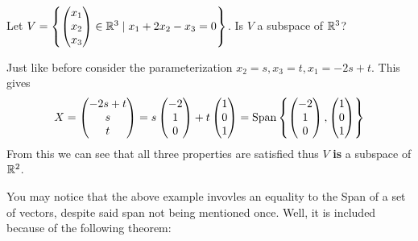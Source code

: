 \begin{example}{}{}
    Let $V = \left\{\begin{pmatrix} x_1 \\ x_2 \\ x_3 \end{pmatrix} \in \mathbb R^{3} \mid x_1 + 2x_2 - x_3 = 0 \right\}$. Is $V$ a subspace of $\mathbb R^{3}$?

    \begin{solution}
        Just like before consider the parameterization $x_2 = s, x_3 = t, x_1 = -2s + t$. This gives 
        \[
            X = \begin{pmatrix}
                -2s + t \\ s \\ t
            \end{pmatrix} 
            = 
            s\begin{pmatrix}
                -2 \\ 1 \\ 0
            \end{pmatrix}
            + 
            t\begin{pmatrix}
                1 \\ 0 \\ 1
            \end{pmatrix}
            = 
            \text{Span}\left\{\begin{pmatrix}
                -2 \\ 1 \\ 0
            \end{pmatrix}, 
            \begin{pmatrix}
                1 \\ 0 \\1
            \end{pmatrix} \right\}
        \]
        From this we can see that all three properties are satisfied thus $V$ \textbf{is} a subspace of $\mathbb R^{2}$. 
    \end{solution}
\end{example}

You may notice that the above example invovles an equality to the Span of a set of vectors, despite said span not being mentioned once. Well, it is included because of the following theorem:

